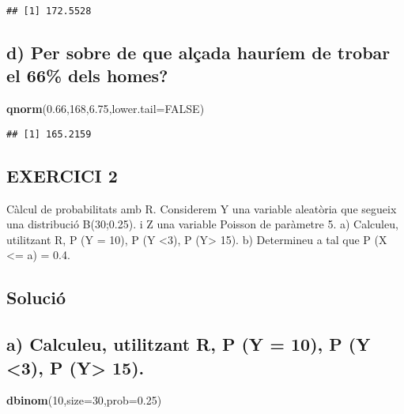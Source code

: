 \documentclass[
]{article}
\newenvironment{Shaded}{\begin{snugshade}}{\end{snugshade}}
\newcommand{\DataTypeTok}[1]{\textcolor[rgb]{0.13,0.29,0.53}{#1}}
\newcommand{\DecValTok}[1]{\textcolor[rgb]{0.00,0.00,0.81}{#1}}
\newcommand{\FloatTok}[1]{\textcolor[rgb]{0.00,0.00,0.81}{#1}}
\newcommand{\KeywordTok}[1]{\textcolor[rgb]{0.13,0.29,0.53}{\textbf{#1}}}
\newcommand{\NormalTok}[1]{#1}
\newcommand{\OtherTok}[1]{\textcolor[rgb]{0.56,0.35,0.01}{#1}}
\begin{document}
\begin{verbatim}
## [1] 172.5528
\end{verbatim}

\hypertarget{d-per-sobre-de-que-aluxe7ada-hauruxedem-de-trobar-el-66-dels-homes}{%
\subsection{d) Per sobre de que alçada hauríem de trobar el 66\% dels
homes?}\label{d-per-sobre-de-que-aluxe7ada-hauruxedem-de-trobar-el-66-dels-homes}}

\begin{Shaded}
\begin{Highlighting}[]
\KeywordTok{qnorm}\NormalTok{(}\FloatTok{0.66}\NormalTok{,}\DecValTok{168}\NormalTok{,}\FloatTok{6.75}\NormalTok{,}\DataTypeTok{lower.tail=}\OtherTok{FALSE}\NormalTok{)}
\end{Highlighting}
\end{Shaded}

\begin{verbatim}
## [1] 165.2159
\end{verbatim}

\hypertarget{exercici-2}{%
\subsection{EXERCICI 2}\label{exercici-2}}

Càlcul de probabilitats amb R. Considerem Y una variable aleatòria que
segueix una distribució B(30;0.25). i Z una variable Poisson de
paràmetre 5. a) Calculeu, utilitzant R, P (Y = 10), P (Y \textless3), P
(Y\textgreater{} 15). b) Determineu a tal que P (X \textless= a) = 0.4.

\hypertarget{soluciuxf3-1}{%
\subsection{Solució}\label{soluciuxf3-1}}

\hypertarget{a-calculeu-utilitzant-r-p-y-10-p-y-3-p-y-15.}{%
\subsection{a) Calculeu, utilitzant R, P (Y = 10), P (Y \textless3), P
(Y\textgreater{}
15).}\label{a-calculeu-utilitzant-r-p-y-10-p-y-3-p-y-15.}}

\begin{Shaded}
\begin{Highlighting}[]
\KeywordTok{dbinom}\NormalTok{(}\DecValTok{10}\NormalTok{,}\DataTypeTok{size=}\DecValTok{30}\NormalTok{,}\DataTypeTok{prob=}\FloatTok{0.25}\NormalTok{)}
\end{Highlighting}
\end{Shaded}
\end{document}
